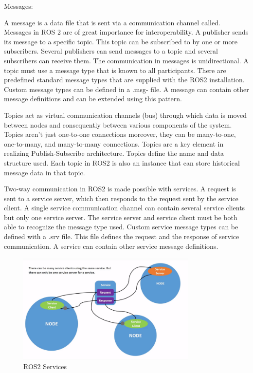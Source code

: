 	\begin{labeling}{Messages:}
		\item [Messages:] 
		A message is a data file that is sent via a communication channel called. Messages in ROS 2 are of great importance for interoperability. A publisher sends its message to a specific topic. This topic can be subscribed to by one or more subscribers. Several publishers can send messages to a topic and several subscribers can receive them. The communication in messages is unidirectional. A topic must use a message type that is known to all participants. There are predefined standard message types that are supplied with the ROS2 installation. Custom message types can be defined in a .msg- file. A message can contain other message definitions and can be extended using this pattern.\cite*{ros2Tutorials}
		
		\item [Topics:] 
		Topics act as virtual communication channels (bus) through which data is moved between nodes and consequently between various components of the system. Topics aren't just one-to-one connections moreover, they can be many-to-one, one-to-many, and many-to-many connections. Topics are a key element in realizing Publish-Subscribe architecture.
		Topics define the name and data structure used. Each topic in ROS2 is also an instance that can store historical message data in that topic.

		\item [Service:] 
		Two-way communication in ROS2 is made possible with services. A request is sent to a service server, which then responds to the request sent by the service client. A single service communication channel can contain several service clients but only one service server. The service server and service client must be both able to recognize the message type used. Custom service message types can be defined with a .srv file. This file defines the request and the response of service communication. A service can contain other service message definitions.
		\begin{figure}[H]
			\centering
			\includegraphics[width=0.8\textwidth]{"Bilder/ros-services.png"}
			\caption{ROS2 Services \cite{ros2Tutorials}}
			\label{fig:Background:Ros2Services}					
		\end{figure}
		

\end{labeling}
